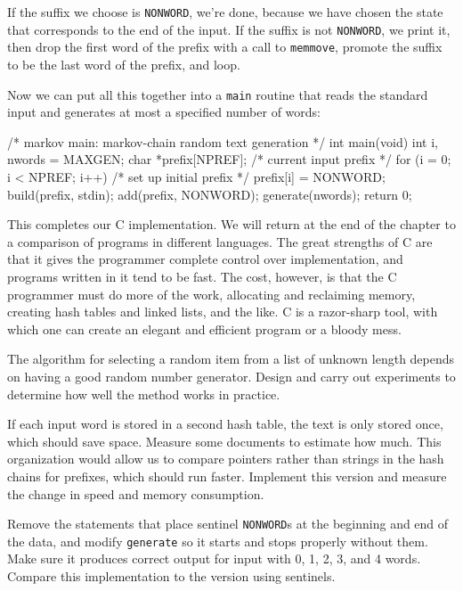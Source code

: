 If the suffix we choose is \verb'NONWORD', we're done, because we have
chosen the state that corresponds to the end of the input. If the suffix is
not \verb'NONWORD', we print it, then drop the first word of the prefix
with a call to \verb'memmove', promote the suffix to be the last word of
the prefix, and loop.

Now we can put all this together into a \verb'main' routine that reads the
standard input and generates at most a specified number of words:
\begin{wellcode}
    /* markov main: markov-chain random text generation */
    int main(void)
    {
        int i, nwords = MAXGEN;
        char    *prefix[NPREF];     /* current input prefix */
        for (i = 0; i < NPREF; i++) /* set up initial prefix */
            prefix[i] = NONWORD;
        build(prefix, stdin);
        add(prefix, NONWORD);
        generate(nwords);
        return 0;
    }
\end{wellcode}

This completes our C implementation. We will return at the end of the
chapter to a comparison of programs in different languages. The great
strengths of C are that it gives the programmer complete control over
implementation, and programs written in it tend to be fast. The cost,
however, is that the C programmer must do more of the work, allocating and
reclaiming memory, creating hash tables and linked lists, and the like. C
is a razor-sharp tool, with which one can create an elegant and efficient
program or a bloody mess.

\begin{exercise}
    The algorithm for selecting a random item from a list of unknown length
    depends on having a good random number generator. Design and carry out
    experiments to determine how well the method works in practice.
\end{exercise}

\begin{exercise}
    If each input word is stored in a second hash table, the text is only
    stored once, which should save space. Measure some documents to
    estimate how much. This organization would allow us to compare pointers
    rather than strings in the hash chains for prefixes, which should run
    faster. Implement this version and measure the change in speed and
    memory consumption.
\end{exercise}

\begin{exercise}
    Remove the statements that place sentinel \verb'NONWORD's at the
    beginning and end of the data, and modify \verb'generate' so it starts
    and stops properly without them. Make sure it produces correct output
    for input with 0, 1, 2, 3, and 4 words.  Compare this implementation to
    the version using sentinels.
\end{exercise}

